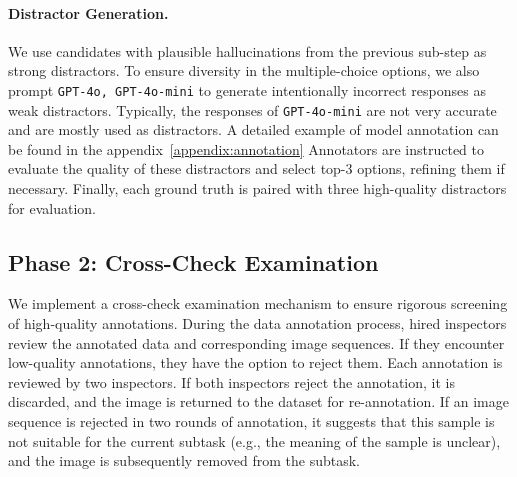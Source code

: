 \paragraph{Distractor Generation.}
We use candidates with plausible hallucinations from the previous sub-step as strong distractors.  To ensure diversity in the multiple-choice options, we also prompt \texttt{GPT-4o, GPT-4o-mini} \cite{hurst2024gpt40} to generate intentionally incorrect responses as weak distractors. 
Typically, the responses of \texttt{GPT-4o-mini}  are not very accurate and are mostly used as distractors. A detailed example of model annotation can be found in the appendix~\ref{appendix:annotation}
Annotators are instructed to evaluate the quality of these distractors and select top-3 options, refining them if necessary. Finally, each ground truth is paired with three high-quality distractors for evaluation.







\subsection{Phase 2: Cross-Check Examination}
We implement a cross-check examination mechanism to ensure rigorous screening of high-quality annotations. During the data annotation process, hired inspectors review the annotated data and corresponding image sequences. If they encounter low-quality annotations, they have the option to reject them. Each annotation is reviewed by two inspectors. If both inspectors reject the annotation, it is discarded, and the image is returned to the dataset for re-annotation. If an image sequence is rejected in two rounds of annotation, it suggests that this sample is not suitable for the current subtask (e.g., the meaning of the sample is unclear), and the image is subsequently removed from the subtask. 

